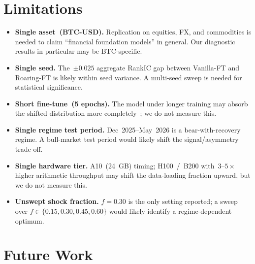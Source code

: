 \documentclass[10pt]{article}
\begin{document}
\section{Limitations}\label{sec:limitations}

\begin{itemize}
\item \textbf{Single asset~(BTC-USD).} Replication on equities, FX,
and commodities is needed to claim ``financial foundation models''
in general. Our diagnostic results in particular may be
BTC-specific.
\item \textbf{Single seed.} The~$\pm 0.025$ aggregate RankIC gap
between Vanilla-FT and Roaring-FT is likely within seed variance. A
multi-seed sweep is needed for statistical significance.
\item \textbf{Short fine-tune~(5 epochs).} The model under longer
training may absorb the shifted distribution more
completely~\citep{curriculum_llm2025}; we do not measure this.
\item \textbf{Single regime test period.}
Dec~2025--May~2026 is a bear-with-recovery regime. A bull-market
test period would likely shift the signal/asymmetry trade-off.
\item \textbf{Single hardware tier.} A10~(24~GB) timing;
H100~/~B200 with~$3$--$5\times$ higher arithmetic throughput may
shift the data-loading fraction upward, but we do not measure
this.
\item \textbf{Unswept shock fraction.} $f=0.30$ is the only setting
reported; a sweep over $f \in \{0.15, 0.30, 0.45, 0.60\}$ would
likely identify a regime-dependent optimum.
\end{itemize}

\section{Future Work}\label{sec:future-work}
\end{document}
